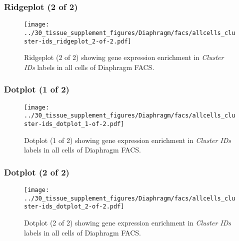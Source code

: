 \clearpage

\subsubsection{Ridgeplot (2 of 2)}
\begin{figure}[h]
\centering
\texttt{[image: ../30\_tissue\_supplement\_figures/Diaphragm/facs/allcells\_cluster-ids\_ridgeplot\_2-of-2.pdf]}

\caption{ Ridgeplot (2 of 2)  showing gene expression enrichment in \emph{Cluster IDs} labels in all cells of Diaphragm FACS. }
\end{figure}


\clearpage

\subsubsection{Dotplot (1 of 2)}
\begin{figure}[h]
\centering
\texttt{[image: ../30\_tissue\_supplement\_figures/Diaphragm/facs/allcells\_cluster-ids\_dotplot\_1-of-2.pdf]}

\caption{ Dotplot (1 of 2)  showing gene expression enrichment in \emph{Cluster IDs} labels in all cells of Diaphragm FACS. }
\end{figure}


\clearpage

\subsubsection{Dotplot (2 of 2)}
\begin{figure}[h]
\centering
\texttt{[image: ../30\_tissue\_supplement\_figures/Diaphragm/facs/allcells\_cluster-ids\_dotplot\_2-of-2.pdf]}

\caption{ Dotplot (2 of 2)  showing gene expression enrichment in \emph{Cluster IDs} labels in all cells of Diaphragm FACS. }
\end{figure}

